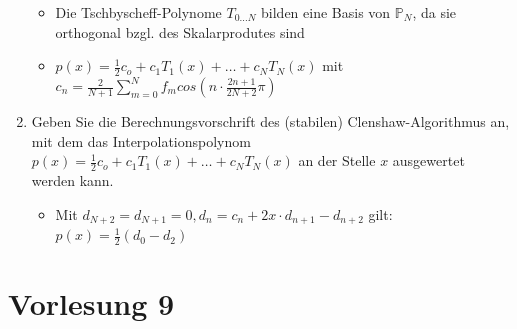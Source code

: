 \documentclass[]{article}
\newcommand*{\poly}{\ensuremath{\mathbb{P}}}
\begin{document}
\begin{enumerate}
			\begin{itemize}
				\item Die Tschbyscheff-Polynome $T_{0\dots N}$ bilden eine Basis von $\poly_N$, da sie orthogonal bzgl. des Skalarprodutes sind
				\item $p(x) = \frac{1}{2}c_o + c_1T_1(x) + \dots + c_NT_N(x)$ mit \\
					$c_n = \frac{2}{N+1} \sum_{m=0}^{N} f_m cos(n \cdot \frac{2n+1}{2N+2} \pi)$
			\end{itemize}
		\item Geben Sie die Berechnungsvorschrift des (stabilen) Clenshaw-Algorithmus an, mit dem das Interpolationspolynom $p(x) = \frac{1}{2}c_o + c_1T_1(x) + \dots + c_NT_N(x)$ an der Stelle $x$ ausgewertet werden kann.
			\begin{itemize}
				\item Mit $d_{N+2} = d_{N+1} = 0, d_n = c_n + 2x \cdot d_{n+1} - d_{n+2}$ gilt: \\
				$p(x) = \frac{1}{2}(d_0 - d_2)$
			\end{itemize}		
	\end{enumerate}

\section{Vorlesung 9}
\end{document}
